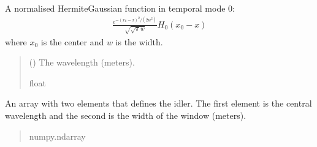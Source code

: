 \documentclass[a4paper,10pt,english]{sphinxmanual}
\begin{document}
\begin{fulllineitems}

\begin{fulllineitems}
\label{\detokenize{pump:pyjsa.pump.Pump.hermite_mode}}
\pysigstartsignatures
{}
\pysigstopsignatures
\sphinxAtStartPar
A normalised Hermite\sphinxhyphen{}Gaussian function in temporal mode 0:
\begin{equation*}
\begin{split}\frac{e^{-(x_0-x)^2/(2w^2)}}{\sqrt{\sqrt{\pi}w}}H_0(x_0-x)\end{split}
\end{equation*}
\sphinxAtStartPar
where \(x_0\) is the center and \(w\) is the width.
\begin{quote}\begin{description}
\sphinxAtStartPar
{} () \textendash{} The wavelength (meters).

\sphinxAtStartPar
float

\end{description}\end{quote}

\end{fulllineitems}


\begin{fulllineitems}
\label{\detokenize{pump:pyjsa.pump.Pump.idler}}
\pysigstartsignatures
{}
\pysigstopsignatures
\sphinxAtStartPar
An array with two elements that defines the idler. The first element is the central wavelength and the second is the width of the window (meters).
\begin{quote}\begin{description}
\sphinxAtStartPar
numpy.ndarray

\end{description}\end{quote}

\end{fulllineitems}


\end{fulllineitems}
\end{document}
